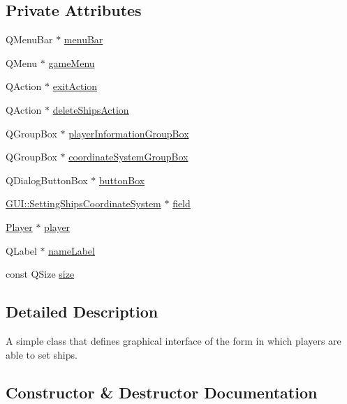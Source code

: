 \subsection*{Private Attributes}
\begin{DoxyCompactItemize}
\item 
Q\+Menu\+Bar $\ast$ \hyperlink{classSetShipsForm_af1e1fab084abbaa2eb09807c6f403a9b}{menu\+Bar}
\item 
Q\+Menu $\ast$ \hyperlink{classSetShipsForm_ac7360174a0bfa93d26e5c7869c1ef093}{game\+Menu}
\item 
Q\+Action $\ast$ \hyperlink{classSetShipsForm_a95088aac220cb7eb4159ab75d86cb81d}{exit\+Action}
\item 
Q\+Action $\ast$ \hyperlink{classSetShipsForm_ab1f248f26fd94e38178e5e5d1bd5b36c}{delete\+Ships\+Action}
\item 
Q\+Group\+Box $\ast$ \hyperlink{classSetShipsForm_ad382b647f03157d361b01d38047aa9c2}{player\+Information\+Group\+Box}
\item 
Q\+Group\+Box $\ast$ \hyperlink{classSetShipsForm_aa71dd8262fdba4230d1072a845520698}{coordinate\+System\+Group\+Box}
\item 
Q\+Dialog\+Button\+Box $\ast$ \hyperlink{classSetShipsForm_a4d76db11c020d3d895f14dcecf268a95}{button\+Box}
\item 
\hyperlink{classGUI_1_1SettingShipsCoordinateSystem}{G\+U\+I\+::\+Setting\+Ships\+Coordinate\+System} $\ast$ \hyperlink{classSetShipsForm_a09111d953f1f3811661c4947c155dbfb}{field}
\item 
\hyperlink{classPlayer}{Player} $\ast$ \hyperlink{classSetShipsForm_a96781128d3743da3d17e0fdd91afba7b}{player}
\item 
Q\+Label $\ast$ \hyperlink{classSetShipsForm_a234f9726dc5a645e96bdc469aeda8f18}{name\+Label}
\item 
const Q\+Size \hyperlink{classSetShipsForm_a28b453b66a8e010eaaab755d702f299d}{size}
\end{DoxyCompactItemize}


\subsection{Detailed Description}
A simple class that defines graphical interface of the form in which players are able to set ships. 

\subsection{Constructor \& Destructor Documentation}
